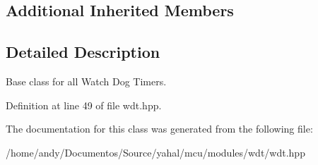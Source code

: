 \subsection*{Additional Inherited Members}


\subsection{Detailed Description}
Base class for all Watch Dog Timers. 

Definition at line 49 of file wdt.\+hpp.



The documentation for this class was generated from the following file\+:\begin{DoxyCompactItemize}
\item 
/home/andy/\+Documentos/\+Source/yahal/mcu/modules/wdt/wdt.\+hpp\end{DoxyCompactItemize}
